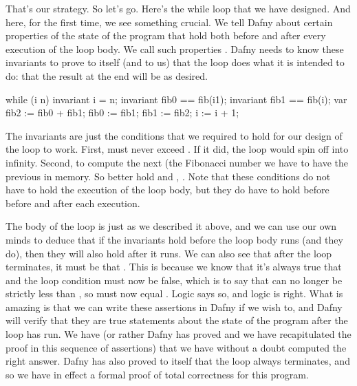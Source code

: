 \documentclass[letterpaper,10pt,english]{sphinxmanual}
\begin{document}
That’s our strategy. So let’s go. Here’s the while loop that we have
designed. And here, for the first time, we see something crucial. We
tell Dafny about certain properties of the state of the program that
hold both before and after every execution of the loop body. We call
such properties . Dafny needs to know these invariants to
prove to itself (and to us) that the loop does what it is intended to
do: that the result at the end will be as desired.

\begin{sphinxVerbatim}[commandchars=\\\{\}]
while (i \PYGZlt{} n)
    invariant i \PYGZlt{}= n;
    invariant fib0 == fib(i\PYGZhy{}1);
    invariant fib1 == fib(i);
\PYGZob{}
    var fib2 := fib0 + fib1;
    fib0 := fib1;
    fib1 := fib2;
    i := i + 1;
\PYGZcb{}
\end{sphinxVerbatim}

The invariants are just the conditions that we required to hold for
our design of the loop to work. First,  must never exceed . If
it did, the loop would spin off into infinity. Second, to compute the
next (the  Fibonacci number we have to have the previous 
in memory. So  better hold  and , . Note
that these conditions do not have to hold  the execution of
the loop body, but they do have to hold before before and after each
execution.

The body of the loop is just as we described it above, and we can use
our own minds to deduce that if the invariants hold before the loop
body runs (and they do), then they will also hold after it runs. We
can also see that after the loop terminates, it must be that .
This is because we know that it’s always true that  and the
loop condition must now be false, which is to say that  can no
longer be strictly less than , so  must now equal . Logic
says so, and logic is right. What is amazing is that we can write
these assertions in Dafny if we wish to, and Dafny will verify that
they are true statements about the state of the program after the
loop has run. We have  (or rather Dafny has proved and we
have recapitulated the proof in this sequence of assertions) that
we have without a doubt computed the right answer. Dafny has also
proved to itself that the loop always terminates, and so we have
in effect a formal proof of total correctness for this program.
\end{document}

